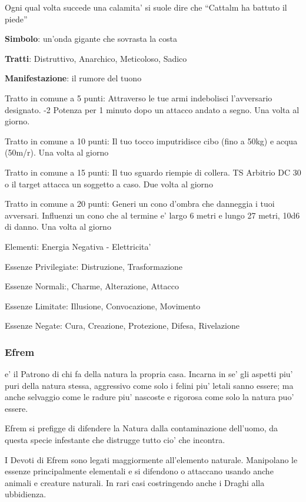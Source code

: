 \documentclass[a4paper,11pt,twoside,openany]{dndbook}
\begin{document}
{Ogni qual volta succede una calamita' si suole dire che ``Cattalm ha battuto il piede''

\textbf{Simbolo}: un'onda gigante che sovrasta la costa

\textbf{Tratti}: Distruttivo, Anarchico, Meticoloso, Sadico

\textbf{Manifestazione}: il rumore del tuono

\bigskip

Tratto in comune a 5 punti: Attraverso le tue armi indebolisci l'avversario designato. -2 Potenza per 1 minuto dopo un attacco andato a segno. Una volta al giorno.

Tratto in comune a 10 punti: Il tuo tocco imputridisce cibo (fino a 50kg) e acqua (50m/r). Una volta al giorno

Tratto in comune a 15 punti: Il tuo sguardo riempie di collera. TS Arbitrio DC 30 o il target attacca un soggetto a caso. Due volta al giorno

Tratto in comune a 20 punti: Generi un cono d'ombra che danneggia i tuoi avversari. Influenzi un cono che al termine e' largo 6 metri e lungo 27 metri, 10d6 di danno. Una volta al giorno

\bigskip

Elementi: Energia Negativa - Elettricita'

\bigskip

Essenze Privilegiate: Distruzione, Trasformazione

Essenze Normali:, Charme, Alterazione, Attacco

Essenze Limitate: Illusione, Convocazione, Movimento
 
Essenze Negate: Cura, Creazione, Protezione, Difesa, Rivelazione

\subsubsection{Efrem}

\label{efrem}

e' il Patrono di chi fa della natura la propria casa. Incarna in se' gli aspetti piu' puri della natura stessa, aggressivo come solo i felini piu' letali sanno essere; ma anche selvaggio come le radure piu' nascoste e rigorosa come solo la natura puo' essere.

Efrem si prefigge di difendere la Natura dalla contaminazione dell'uomo, da questa specie infestante che distrugge tutto cio' che incontra.

I Devoti di Efrem sono legati maggiormente all'elemento naturale. Manipolano le essenze principalmente elementali e si difendono o attaccano usando anche animali e creature naturali. In rari casi costringendo anche i Draghi alla ubbidienza.

}
\end{document}
